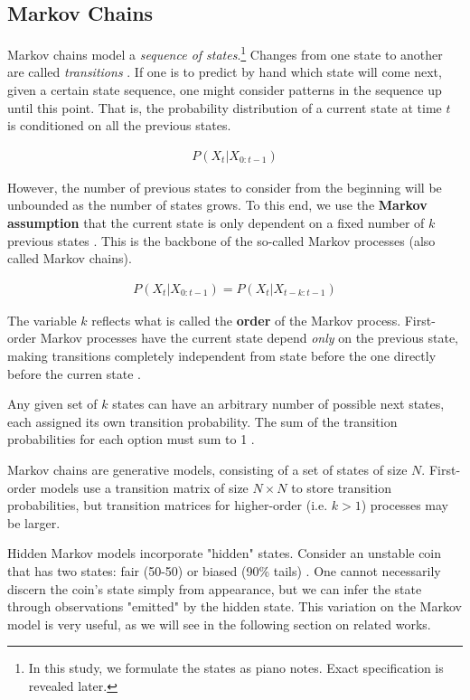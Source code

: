 \documentclass{article}
\begin{document}
\subsection{Markov Chains}
Markov chains model a \emph{sequence of states}.\footnote{In this study, we formulate the states as piano notes. Exact specification is revealed later.} Changes from 
one state to another are called \emph{transitions} \cite{markov_survey}. If one is to predict by hand which state will come next, given a certain state sequence, one might 
consider patterns in the sequence up until this point. That is, the probability distribution of a current state at time $t$ is conditioned on all the previous states.

\begin{align*}
  P(X_t | X_{0:t-1})
\end{align*}

However, the number of previous states to consider from the beginning will be unbounded as the number of states grows. To this end, we use the \textbf{Markov assumption} that 
the current state is only dependent on a fixed number of $k$ previous states \cite{russell_norvig_2022}. This is the backbone of the so-called Markov processes (also called 
Markov chains). 

\begin{align*}
  P(X_t | X_{0:t-1}) = P(X_t | X_{t-k:t-1})
\end{align*}

The variable $k$ reflects what is called the \textbf{order} of the Markov process. First-order Markov processes have the current state depend \emph{only} on the previous 
state, making transitions completely independent from state before the one directly before the curren state \cite{russell_norvig_2022}.

Any given set of $k$ states can have an arbitrary number of possible next states, each assigned its own transition probability. The sum of the transition probabilities 
for each option must sum to 1 \cite{markov_construct}. 

Markov chains are generative models, consisting of a set of states of size $N$. First-order models use a transition matrix of size $N\times N$ to store transition 
probabilities, but transition matrices for higher-order (i.e. $k>1$) processes may be larger.

Hidden Markov models incorporate "hidden" states. Consider an unstable coin that has two states: fair (50-50) or biased (90\% tails) \cite{hmms}. One cannot necessarily 
discern the coin's state simply from appearance, but we can infer the state through observations "emitted" by the hidden state. This variation on the Markov model is very 
useful, as we will see in the following section on related works. 
\end{document}
